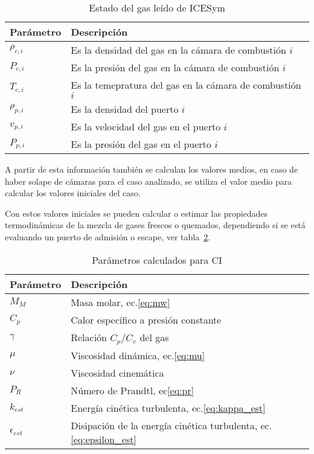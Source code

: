 \begin{table}
  \centering
  \begin{tabular}{ll}\toprule
    Parámetro & Descripción \\ \midrule
    $\rho_{c,i}$ & Es la densidad del gas en la cámara de combustión $i$\\
    $P_{c,i}$ & Es la presión del gas en la cámara de combustión $i$ \\
    $T_{c,i}$ & Es la temepratura del gas en la cámara de combustión $i$ \\
    $\rho_{p,i}$ & Es la densidad del puerto $i$ \\
    $v_{p,i}$ & Es la velocidad del gas en el puerto $i$ \\
    $P_{p,i}$ & Es la presión del gas en el puerto $i$ \\ \bottomrule
    \end{tabular}
    \caption{Estado del gas leído de ICESym}\label{tab:estado_gas_icesym}
\end{table}

A partir de esta información también se calculan los valores medios, en caso de
haber solape de cámaras para el caso analizado, se utiliza el valor medio para
calcular los valores iniciales del caso.

Con estos valores iniciales se pueden calcular o estimar las propiedades
termodinámicas de la mezcla de gases frescos o quemados, dependiendo si se está
evaluando un puerto de admisión o escape, ver tabla~\ref{tab:ci_calculados}.
%

\begin{table}
  \centering
  \begin{tabular}{ll}\toprule
    Parámetro & Descripción \\ \midrule
    $M_{M}$ & Masa molar, ec.\ref{eq:mw} \\
    $C_{p}$ & Calor específico a presión constante \\
    $\gamma$ & Relación $C_{p}/C_{v}$ del gas \\
    $\mu$ & Viscosidad dinámica, ec.\ref{eq:mu} \\
    $\nu$ & Viscosidad cinemática \\
    $P_{R}$ & Número de Prandtl, ec\ref{eq:pr}\\
    $k_{est}$ & Energía cinética turbulenta, ec.\ref{eq:kappa_est} \\ \bottomrule
    $\epsilon_{est}$ & Disipación de la energía cinética turbulenta, ec.\ref{eq:epsilon_est}\\
    \end{tabular}
    \caption{Parámetros calculados para CI}\label{tab:ci_calculados}
\end{table}

